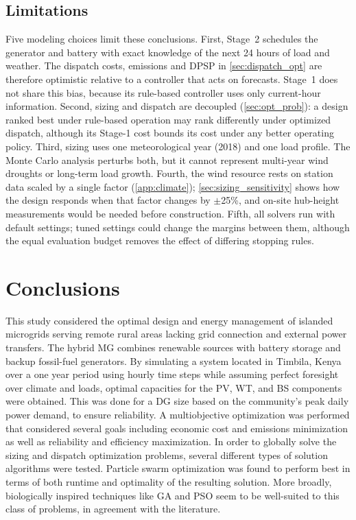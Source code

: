 \documentclass[final,3p,times]{elsarticle}
\begin{document}
\subsection{Limitations\label{sec:limitations}}
Five modeling choices limit these conclusions. First, Stage~2 schedules the generator and battery with exact knowledge of the next 24 hours of load and weather. The dispatch costs, emissions and DPSP in \cref{sec:dispatch_opt} are therefore optimistic relative to a controller that acts on forecasts. Stage~1 does not share this bias, because its rule-based controller uses only current-hour information. Second, sizing and dispatch are decoupled (\cref{sec:opt_prob}): a design ranked best under rule-based operation may rank differently under optimized dispatch, although its Stage-1 cost bounds its cost under any better operating policy. Third, sizing uses one meteorological year (2018) and one load profile. The Monte Carlo analysis perturbs both, but it cannot represent multi-year wind droughts or long-term load growth. Fourth, the wind resource rests on station data scaled by a single factor (\cref{app:climate}); \cref{sec:sizing_sensitivity} shows how the design responds when that factor changes by $\pm$25\%, and on-site hub-height measurements would be needed before construction. Fifth, all solvers run with default settings; tuned settings could change the margins between them, although the equal evaluation budget removes the effect of differing stopping rules.

\section{Conclusions}

This study considered the optimal design and energy management of islanded microgrids serving remote rural areas lacking grid connection and external power transfers. The hybrid MG combines renewable sources with battery storage and backup fossil-fuel generators. By simulating a system located in Timbila, Kenya over a one year period using hourly time steps while assuming perfect foresight over climate and loads, optimal capacities for the PV, WT, and BS components were obtained. This was done for a DG size based on the community's peak daily power demand, to ensure reliability. A multiobjective optimization was performed that considered several goals including economic cost and emissions minimization as well as reliability and efficiency maximization. In order to globally solve the sizing and dispatch optimization problems, several different types of solution algorithms were tested. Particle swarm optimization was found to perform best in terms of both runtime and optimality of the resulting solution. More broadly, biologically inspired techniques like GA and PSO seem to be well-suited to this class of problems, in agreement with the literature. 
\end{document}
